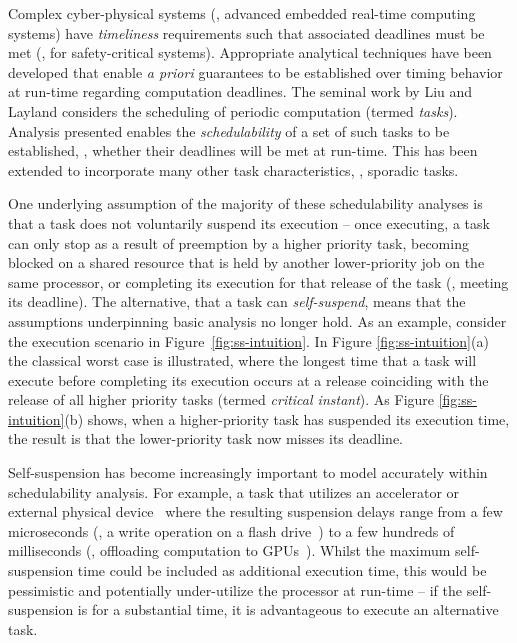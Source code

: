 
Complex cyber-physical systems (\ie, advanced embedded real-time computing systems) have \emph{timeliness} requirements %
such that associated deadlines must be met (\eg, for safety-critical systems). Appropriate analytical techniques have been developed that enable \emph{a priori} guarantees to be established over timing behavior at run-time regarding computation deadlines.  
The seminal work by Liu and Layland \cite{Liu_1973} considers the scheduling of periodic computation (termed \emph{tasks}). 
Analysis presented enables the \emph{schedulability} of a set of such tasks to be established, \ie, whether their deadlines will be met at run-time. This has been extended to incorporate many other task characteristics, \eg, sporadic tasks\cite{Mok:1983:FDP:888951}. 

One underlying assumption of the majority of these schedulability analyses is that a task does not voluntarily suspend its execution -- once executing, a task can only stop as a result of preemption by a higher priority task, becoming blocked on a shared resource that is held by another lower-priority job on the same processor, or completing its execution for that release of the task (\ie, meeting its deadline). The alternative, that a task can \emph{self-suspend}, means that the assumptions underpinning basic analysis no longer hold. As an example, consider the execution scenario in Figure~\ref{fig:ss-intuition}. In Figure \ref{fig:ss-intuition}(a) the classical worst case is illustrated, where the longest time that a task will execute before completing its execution occurs at a release coinciding with the release of all higher priority tasks (termed \emph{critical instant}). As Figure \ref{fig:ss-intuition}(b) shows, when a higher-priority task  has suspended its execution time, the result is that the lower-priority task now misses its deadline.


Self-suspension has become increasingly important to model accurately within schedulability analysis. For example, a task that utilizes an accelerator or external physical device~\cite{Kang:rtss07,Kato_2011} where the resulting suspension delays range from a few microseconds (\eg, a write operation on a flash drive~\cite{Kang:rtss07}) to a few hundreds of milliseconds (\eg, offloading computation to GPUs~\cite{Kato_2011,Liu_2014}).  Whilst the maximum self-suspension time could be included as additional execution time, this would be pessimistic and potentially under-utilize the processor at run-time -- if the self-suspension is for a substantial time, it is advantageous to execute an alternative task.

